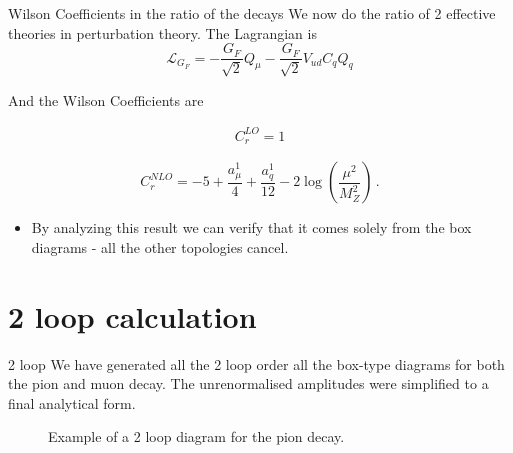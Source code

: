 \documentclass[11pt]{beamer}
\begin{document}
\begin{frame}{Wilson Coefficients in the ratio of the decays}
We now do the ratio of 2 effective theories in perturbation theory. The Lagrangian is
\begin{equation}
  \mathcal{L}_{G_F} = -\frac{G_F}{\sqrt{2}} Q_\mu -\frac{G_F}{\sqrt{2}} V_{ud} C_{q} Q_q
\end{equation}

And the Wilson Coefficients are

\begin{align}
  C_{r}^{{LO}}  = 1
\end{align}

\begin{equation}
  C^{NLO}_r = -5 +\frac{a^1_\mu}{4}+\frac{a^1_q}{12} - 2\log\left( \frac{\mu^2}{M_Z^2} \right)\,.
\end{equation}

\begin{itemize}
    \item By analyzing this result we can verify that it comes solely from the box diagrams - all the other topologies cancel.
\end{itemize}
\end{frame}


\section{2 loop calculation}

\begin{frame}{2 loop}
We have generated all the 2 loop order all the box-type diagrams for both the pion and muon decay. The unrenormalised amplitudes were simplified to a final analytical form. 


\begin{figure}[h]
\centering
{}
\caption{Example of a 2 loop diagram for the pion decay.}
\end{figure}
\end{frame}
\end{document}
